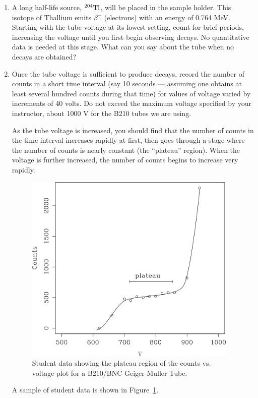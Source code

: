 \documentclass{article}
\begin{document}
\begin{enumerate}
\item A long half-life source, ${}^{204}{\rm Tl}$, will be placed in the sample
holder.  This isotope of Thallium emits $\beta^-$ (electrons) with an energy of 0.764 MeV.  Starting with the tube voltage at its lowest setting, count
for brief periods, increasing the voltage until you first begin
observing decays.  No quantitative data is needed at this stage.
What can you say about the tube when no decays are obtained?

\item Once the tube voltage is sufficient to produce decays, record the
number of counts in a short time interval (say 10 seconds --- assuming one obtains at least
several hundred counts during that time) for values of voltage varied
by increments of 40 volts.  Do not exceed the maximum voltage
specified by your instructor, about 1000 V for the B210 tubes we are using.

As the tube voltage is increased, you should find that the number of
counts in the time interval increases rapidly at first, then goes
through a stage where the number of counts is nearly constant (the
``plateau'' region).  When the voltage is
further increased, the number of counts begins to increase very
rapidly.
\begin{figure}
\begin{centering}
\includegraphics[width=4in]{images/gmplateau.png}
\caption{Student data showing the plateau region of the counts vs. voltage plot for a B210/BNC Geiger-Muller Tube.}
\label{fig:rate-V}
\end{centering}
\end{figure}
A sample of student data is shown in Figure~\ref{fig:rate-V}.


\end{enumerate}
\end{document}
